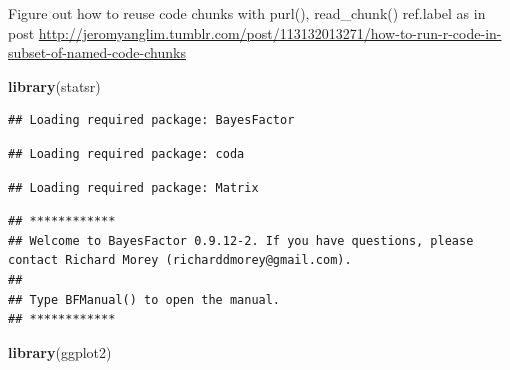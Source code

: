 \documentclass[]{book}
\newenvironment{Shaded}{\begin{snugshade}}{\end{snugshade}}
\newcommand{\KeywordTok}[1]{\textcolor[rgb]{0.13,0.29,0.53}{\textbf{{#1}}}}
\newcommand{\NormalTok}[1]{{#1}}
\theoremstyle{definition}
\theoremstyle{definition}
\theoremstyle{definition}
\theoremstyle{remark}
\begin{document}
Figure out how to reuse code chunks with purl(), read\_chunk() ref.label
as in post
\url{http://jeromyanglim.tumblr.com/post/113132013271/how-to-run-r-code-in-subset-of-named-code-chunks}

\begin{Shaded}
\begin{Highlighting}[]
\KeywordTok{library}\NormalTok{(statsr)}
\end{Highlighting}
\end{Shaded}

\begin{verbatim}
## Loading required package: BayesFactor
\end{verbatim}

\begin{verbatim}
## Loading required package: coda
\end{verbatim}

\begin{verbatim}
## Loading required package: Matrix
\end{verbatim}

\begin{verbatim}
## ************
## Welcome to BayesFactor 0.9.12-2. If you have questions, please contact Richard Morey (richarddmorey@gmail.com).
## 
## Type BFManual() to open the manual.
## ************
\end{verbatim}

\begin{Shaded}
\begin{Highlighting}[]
\KeywordTok{library}\NormalTok{(ggplot2)}
\end{Highlighting}
\end{Shaded}
\end{document}

